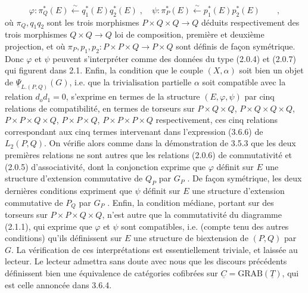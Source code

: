 \begin{equation*}
\varphi : \pi_Q^*(E) \overset{\sim}{\longleftarrow} q_1^*(E)q_2^*(E) \;,\quad \psi : \pi_P^*(E) \overset{\sim}{\longleftarrow} p_1^*(E)p_2^*(E) \qquad ,
\end{equation*}
où $\pi_Q,q_1q_2$ sont les trois morphismes $P\times Q\times Q \longrightarrow Q$ déduits respectivement des trois morphismes $Q\times Q \longrightarrow Q$ loi de composition, première et deuxième projection, et où $\pi_P,p_1,p_2: P\times P\times Q \longrightarrow P\times Q$ sont définis de façon symétrique. Donc $\varphi$ et $\psi$ peuvent s'interpréter comme des données du type (2.0.4) et (2.0.7) qui figurent dans 2.1. Enfin, la condition que le couple $(X,\alpha)$ soit bien un objet de $\underline{\Psi}_{L.(P,Q)}(G)$, i.e. que la trivialisation partielle $\alpha$ soit compatible avec la relation $d_od_1=0$, s'exprime en termes de la structure $(E,\varphi,\psi)$ par cinq relations de compatibilité, en termes de torseurs sur $P\times Q\times Q$, $P\times Q\times Q\times Q$, $P\times P\times Q\times Q$, $P\times P\times Q$, $P\times P\times P\times Q$ respectivement, ces cinq relations correspondant aux cinq termes intervenant dans l'expression (3.6.6) de $L_2(P,Q)$. On vérifie alors comme dans la démonstration de 3.5.3 que les deux premières relations ne sont autres que les relations (2.0.6) de commutativité et (2.0.5) d'associativité, dont la conjonction exprime que $\varphi$ définit sur $E$ une structure d'extension commutative de $Q_P$ par $G_P$ . De façon symétrique, les deux dernières conditions expriment que $\psi$ définit sur $E$ une structure d'extension commutative de $P_Q$ par $G_P$ . Enfin, la condition médiane, portant sur des torseurs sur $P\times P\times Q\times Q$, n'est autre que la commutativité du diagramme (2.1.1), qui exprime que $\varphi$ et $\psi$ sont compatibles, i.e. (compte tenu des autres conditions) qu'ils définissent sur $E$ une structure de biextension de $(P,Q)$ par $G$. La vérification de ces
interprétations est essentiellement triviale, et laissée au lecteur. Le lecteur admettra sans doute avec nous que les discours précédents définissent bien une équivalence de catégories cofibrées sur $\underline{C} = \mathrm{GRAB}(\underline{T})$, qui est celle annoncée dans 3.6.4.

